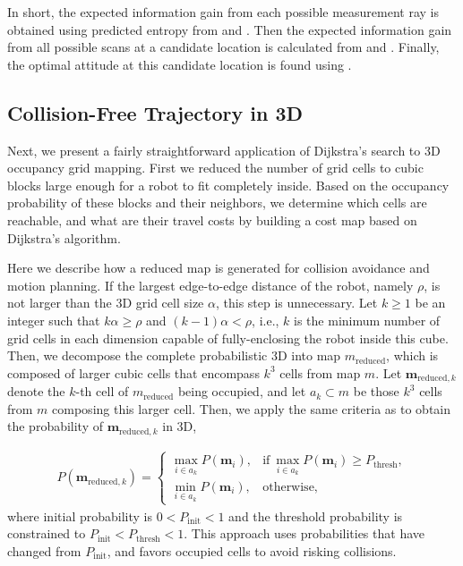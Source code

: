 In short, the expected information gain from each possible measurement ray is obtained using predicted entropy from  and . Then the expected information gain from all possible scans at a candidate location is calculated from  and . Finally, the optimal attitude at this candidate location is found using .

\subsection{Collision-Free Trajectory in 3D}

Next, we present a fairly straightforward application of Dijkstra's search to 3D occupancy grid mapping. First we reduced the number of grid cells to cubic blocks large enough for a robot to fit completely inside. Based on the occupancy probability of these blocks and their neighbors, we determine which cells are reachable, and what are their travel costs by building a cost map based on Dijkstra's algorithm.

Here we describe how a reduced map is generated for collision avoidance and motion planning. If the largest edge-to-edge distance of the robot, namely $\rho$, is not larger than the 3D grid cell size $\alpha$, this step is unnecessary. Let $k\geq1$ be an integer such that $k\alpha\geq\rho$ and $(k-1)\alpha<\rho$, i.e., $k$ is the minimum number of grid cells in each dimension capable of fully-enclosing the robot inside this cube. Then, we decompose the complete probabilistic 3D into map $ m_\text{reduced}$, which is composed of larger cubic cells that encompass $k^3$ cells from map $ m$. Let $\mathbf{m}_{\text{reduced},k}$ denote the $k$-th cell of $ m_\text{reduced}$ being occupied, and let $a_k\subset m$ be those $k^3$ cells from $ m$ composing this larger cell. Then, we apply the same criteria as  to obtain the probability of $\mathbf{m}_{\text{reduced},k}$ in 3D,

\begin{align}
\label{eqn:Proj3DMapComb}
P(\mathbf{m}_{\text{reduced},k})= 
\begin{cases}
    \max_{i\in a_k}{P(\mathbf{m}_i)},	&\text{if} \ \max_{i\in a_k}{P(\mathbf{m}_i)}\geq P_\text{thresh},\\
    \min_{i\in a_k}{P(\mathbf{m}_i)},	& \text{otherwise},
\end{cases}
\end{align}
where initial probability is $0<P_\text{init}<1$ and the threshold probability is constrained to $P_\text{init}<P_\text{thresh}<1$. This approach uses probabilities that have changed from $P_\text{init}$, and favors occupied cells to avoid risking collisions.

